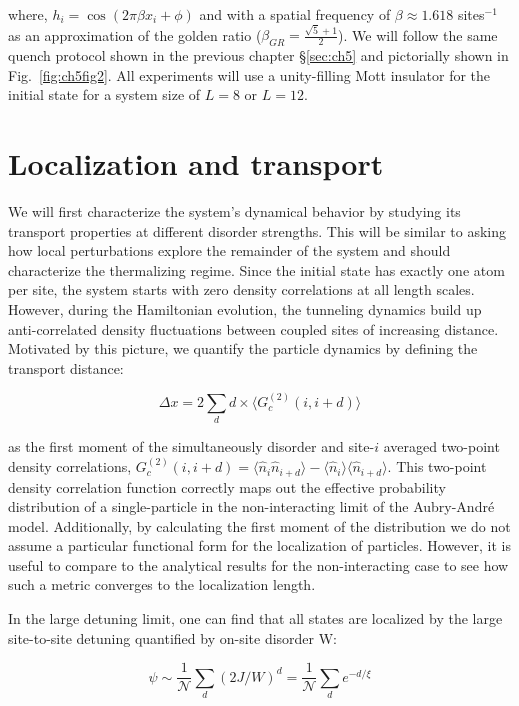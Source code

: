 where, $h_i = \cos (2 \pi \beta x_i + \phi)$ and with a spatial frequency of $\beta \approx 1.618$ sites${^{-1}}$ as an approximation of the golden ratio ($\beta_{GR} = \frac{\sqrt{5}+1}{2}$). We will follow the same quench protocol shown in the previous chapter \S \ref{sec:ch5} and pictorially shown in Fig.~\ref{fig:ch5fig2}. All experiments will use a unity-filling Mott insulator for the initial state for a system size of $L=8$ or $L=12$.

\section{Localization and transport}
\label{sec:AALoc}

We will first characterize the system's dynamical behavior by studying its transport properties at different disorder strengths. This will be similar to asking how local perturbations explore the remainder of the system and should characterize the thermalizing regime. Since the initial state has exactly one atom per site, the system starts with zero density correlations at all length scales. However, during the Hamiltonian evolution, the tunneling dynamics build up anti-correlated density fluctuations between coupled sites of increasing distance. Motivated by this picture, we quantify the particle dynamics by defining the transport distance:

\begin{equation}
\label{eqn:deltax}
\Delta x = 2 \sum_d d \times \langle G^{(2)}_c (i,i+d) \rangle
\end{equation}

as the first moment of the simultaneously disorder and site-$i$ averaged two-point density correlations, $G^{(2)}_c(i,i+d) = \langle \hat{n}_i \hat{n}_{i+d} \rangle - \langle \hat{n}_i \rangle \langle \hat{n}_{i+d} \rangle$. This two-point density correlation function correctly maps out the effective probability distribution of a single-particle in the non-interacting limit of the Aubry-Andr\'e model. Additionally, by calculating the first moment of the distribution we do not assume a particular functional form for the localization of particles. However, it is useful to compare to the analytical results for the non-interacting case to see how such a metric converges to the localization length. 

In the large detuning limit, one can find that all states are localized by the large site-to-site detuning quantified by on-site disorder W:

\[
\psi \sim \frac{1}{\mathcal{N}} \sum_d (2 J/W)^d = \frac{1}{\mathcal{N}} \sum_d e^{-d/\xi}
\]

